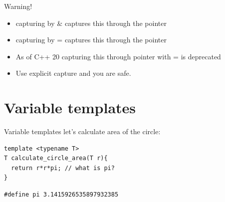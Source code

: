 \documentclass[10pt]{beamer}
\begin{document}
\begin{frame}{Warning!}
	\begin{itemize}[<+- |alert@+>]
		\item capturing by \alert{\&} captures \alert{this} through the pointer
		\item capturing by \alert{=} captures \alert{this} through the pointer
		\item As of C++ 20 capturing this through pointer with \alert{=} is deprecated
		\item Use explicit capture and you are safe.
	\end{itemize}
\end{frame}


\section{Variable templates}
\begin{frame}[fragile]{Variable templates}
	\centering let's calculate area of the circle:

	\begin{verbatim}
template <typename T>
T calculate_circle_area(T r){
  return r*r*pi; // what is pi?
}	
	\end{verbatim}

	\pause

	\begin{verbatim}
#define pi 3.1415926535897932385 
	\end{verbatim} 

\end{frame}
\end{document}
